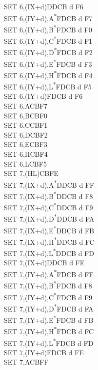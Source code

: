 \documentclass[twoside,openright,a4paper]{book}
\begin{document}
\begin{multicols}{3}
{\begin{tabbing}
	SET 6,(IX+d)\>DDCB d F6\\
	SET 6,(IY+d),A\textsuperscript{*}\>FDCB d F7\\
	SET 6,(IY+d),B\textsuperscript{*}\>FDCB d F0\\
	SET 6,(IY+d),C\textsuperscript{*}\>FDCB d F1\\
	SET 6,(IY+d),D\textsuperscript{*}\>FDCB d F2\\
	SET 6,(IY+d),E\textsuperscript{*}\>FDCB d F3\\
	SET 6,(IY+d),H\textsuperscript{*}\>FDCB d F4\\
	SET 6,(IY+d),L\textsuperscript{*}\>FDCB d F5\\
	SET 6,(IY+d)\>FDCB d F6\\
	SET 6,A\>CBF7\\
	SET 6,B\>CBF0\\
	SET 6,C\>CBF1\\
	SET 6,D\>CBF2\\
	SET 6,E\>CBF3\\
	SET 6,H\>CBF4\\
	SET 6,L\>CBF5\\
	SET 7,(HL)\>CBFE\\
	SET 7,(IX+d),A\textsuperscript{*}\>DDCB d FF\\
	SET 7,(IX+d),B\textsuperscript{*}\>DDCB d F8\\
	SET 7,(IX+d),C\textsuperscript{*}\>DDCB d F9\\
	SET 7,(IX+d),D\textsuperscript{*}\>DDCB d FA\\
	SET 7,(IX+d),E\textsuperscript{*}\>DDCB d FB\\
	SET 7,(IX+d),H\textsuperscript{*}\>DDCB d FC\\
	SET 7,(IX+d),L\textsuperscript{*}\>DDCB d FD\\
	SET 7,(IX+d)\>DDCB d FE\\
	SET 7,(IY+d),A\textsuperscript{*}\>FDCB d FF\\
	SET 7,(IY+d),B\textsuperscript{*}\>FDCB d F8\\
	SET 7,(IY+d),C\textsuperscript{*}\>FDCB d F9\\
	SET 7,(IY+d),D\textsuperscript{*}\>FDCB d FA\\
	SET 7,(IY+d),E\textsuperscript{*}\>FDCB d FB\\
	SET 7,(IY+d),H\textsuperscript{*}\>FDCB d FC\\
	SET 7,(IY+d),L\textsuperscript{*}\>FDCB d FD\\
	SET 7,(IY+d)\>FDCB d FE\\
	SET 7,A\>CBFF\\

\end{tabbing}}
\end{multicols}
\end{document}
